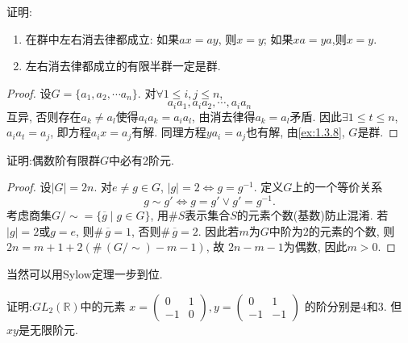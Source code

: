 \begin{problem}\label{ex:1.3.9}
    证明: 
\begin{enumerate}[(1)]
    \item 在群中左右消去律都成立: 如果$ax = ay$, 则$x = y$; 如果$xa = ya$,则$x = y$.
    \item 左右消去律都成立的有限半群一定是群.
\end{enumerate}
\end{problem}

\begin{proof}
    设$G = \{a_1, a_2, \cdots a_n\}$. 对$\forall 1 \leqslant i, j \leqslant n$,
\[
    a_ia_1, a_ia_2, \cdots, a_ia_n
\]
互异, 否则存在$a_k \neq a_l$使得$a_ia_k = a_ia_l$, 由消去律得$a_k = a_l$矛盾.
因此$\exists 1 \leqslant t \leqslant n$, $a_ia_t = a_j$, 即方程$a_ix = a_j$有解.
同理方程$ya_i = a_j$也有解, 由\ref{ex:1.3.8}, $G$是群.
\end{proof}

\begin{problem}
    证明:偶数阶有限群$G$中必有$2$阶元.
\end{problem}

\begin{proof}
    设$|G| = 2n$. 对$e \neq g \in G$, $|g| = 2 \iff g = g^{-1}$.
定义$G$上的一个等价关系
\[
    g \sim g' \iff g = g' \lor g' = g^{-1}.
\]
考虑商集$G/\sim = \{\overline{g} \mid g \in G\}$,
用$\#S$表示集合$S$的元素个数(基数)防止混淆.
若$|g| = 2$或$g = e$, 则$\#\, \overline{g} = 1$, 否则$\#\, \overline{g} = 2$.
因此若$m$为$G$中阶为$2$的元素的个数, 则$2n = m + 1 + 2(\#\, (G/\sim) - m - 1)$, 故
$2n - m - 1$为偶数, 因此$m > 0$.    
\end{proof}

\begin{remark}
    当然可以用Sylow定理一步到位.
\end{remark}

\begin{problem}
    证明:$GL_2(\mathbb{R})$中的元素
\(
x = \begin{pmatrix}
        0 & 1\\
        -1 & 0
\end{pmatrix}, 
y = \begin{pmatrix}
        0 & 1\\
        -1 & -1
\end{pmatrix}
\)
的阶分别是$4$和$3$. 但$xy$是无限阶元.
\end{problem}

